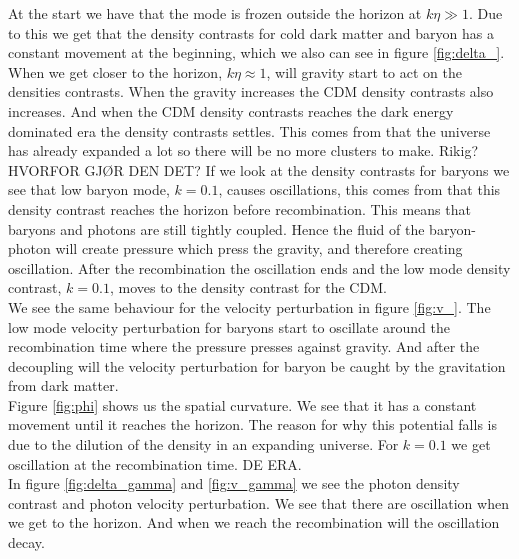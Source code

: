 \documentclass{aa}
\begin{document}
At the start we have that the mode is frozen outside the horizon at $k\eta\gg1$. Due to this we get that the density contrasts for cold dark matter and baryon has a constant movement at the beginning, which we also can see in figure \eqref{fig:delta_}. When we get closer to the horizon, $k\eta\approx1$, will gravity start to act on the densities contrasts. When the gravity increases the CDM density contrasts also increases. And when the CDM density contrasts reaches the dark energy dominated era the density contrasts settles. This comes from that the universe has already expanded a lot so there will be no more clusters to make. Rikig? HVORFOR GJØR DEN DET? If we look at the density contrasts for baryons we see that low baryon mode, $k=0.1$, causes oscillations, this comes from that this density contrast reaches the horizon before recombination. This means that baryons and photons are still tightly coupled. Hence the fluid of the baryon-photon will create pressure which press the gravity, and therefore creating oscillation. After the recombination the oscillation ends and the low mode density contrast, $k=0.1$, moves to the density contrast for the CDM. \\
We see the same behaviour for the velocity perturbation in figure \eqref{fig:v_}. The low mode velocity perturbation for baryons start to oscillate around the recombination time where the pressure presses against gravity. And after the decoupling will the velocity perturbation for baryon be caught by the gravitation from dark matter. \\
Figure \eqref{fig:phi} shows us the spatial curvature. We see that it has a constant movement until it reaches the horizon. The reason for why this potential falls is due to the dilution of the density in an expanding universe. For $k=0.1$ we get oscillation at the recombination time. DE ERA. \\
In figure \eqref{fig:delta_gamma} and \eqref{fig:v_gamma} we see the photon density contrast and photon velocity perturbation. We see that there are oscillation when we get to the horizon. And when we reach the recombination will the oscillation decay.\\

%
%
\clearpage
\appendix %
\end{document}
